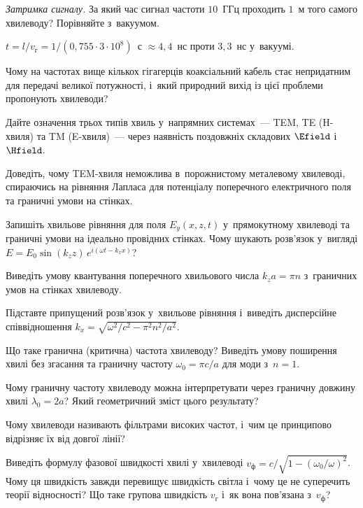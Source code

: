 \begin{problem}\label{prb:WaveguideDelay}
	\emph{Затримка сигналу.} За який час сигнал частоти $10$~ГГц проходить $1$~м того самого хвилеводу? Порівняйте з~вакуумом.
	\begin{solution}
		$t = l/v_\text{г} = 1/(0{,}755\cdot3\cdot10^{8})$~с $\approx 4{,}4$~нс проти $3{,}3$~нс у~вакуумі.
	\end{solution}
\end{problem}

\begin{Questions}
	\begin{quizlist}
		\item Чому на частотах вище кількох гігагерців коаксіальний кабель стає непридатним для передачі великої потужності, і~який природний вихід із цієї проблеми пропонують хвилеводи?
		\item Дайте означення трьох типів хвиль у~напрямних системах~--- TEM, TE (H-хвиля) та TM (E-хвиля)~--- через наявність поздовжніх складових $\Efield$ і~$\Hfield$.
		\item Доведіть, чому TEM-хвиля неможлива в~порожнистому металевому хвилеводі, спираючись на рівняння Лапласа для потенціалу поперечного електричного поля та граничні умови на стінках.
		\item Запишіть хвильове рівняння для поля $E_y(x,z,t)$ у~прямокутному хвилеводі та граничні умови на ідеально провідних стінках. Чому шукають розв'язок у~вигляді $E=E_0\sin(k_zz)\,e^{i(\omega t-k_xx)}$?
		\item Виведіть умову квантування поперечного хвильового числа $k_za=\pi n$ з~граничних умов на стінках хвилеводу.
		\item Підставте припущений розв'язок у~хвильове рівняння і~виведіть дисперсійне співвідношення $k_x=\sqrt{\omega^2/c^2-\pi^2n^2/a^2}$.
		\item Що таке гранична (критична) частота хвилеводу? Виведіть умову поширення хвилі без згасання та граничну частоту $\omega_0=\pi c/a$ для моди з~$n=1$.
		\item Чому граничну частоту хвилеводу можна інтерпретувати через граничну довжину хвилі $\lambda_0=2a$? Який геометричний зміст цього результату?
		\item Чому хвилеводи називають фільтрами високих частот, і~чим це принципово відрізняє їх від довгої лінії?
		\item Виведіть формулу фазової швидкості хвилі у~хвилеводі $v_\text{ф}=c/\sqrt{1-(\omega_0/\omega)^2}$. Чому ця швидкість завжди перевищує швидкість світла і~чому це не суперечить теорії відносності? Що таке групова швидкість $v_\text{г}$ і~як вона пов'язана з~$v_\text{ф}$?

\end{quizlist}
\end{Questions}
